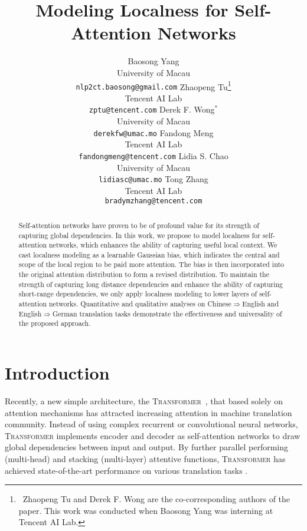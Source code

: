 \documentclass[11pt,a4paper]{article}
\title{Modeling Localness for Self-Attention Networks}
\author{Baosong Yang\\\normalsize University of Macau\\{\normalsize \tt nlp2ct.baosong@gmail.com} \And
Zhaopeng Tu\thanks{~Zhaopeng Tu and Derek F. Wong are the co-corresponding authors of the paper. This work was conducted when Baosong Yang was interning at Tencent AI Lab.}\\\normalsize Tencent AI Lab\\{\normalsize \tt zptu@tencent.com} \And
Derek F. Wong$^*$\\\normalsize University of Macau\\{\normalsize \tt derekfw@umac.mo} \AND
Fandong Meng\\\normalsize Tencent AI Lab\\{\normalsize \tt fandongmeng@tencent.com} \And
Lidia S. Chao\\\normalsize University of Macau\\{\normalsize \tt lidiasc@umac.mo} \And
Tong Zhang\\\normalsize Tencent AI Lab\\{\normalsize \tt bradymzhang@tencent.com}
}
\begin{document}
\maketitle
\begin{abstract}
Self-attention networks have proven to be of profound value for its strength of capturing global dependencies.
In this work, we propose to model localness for self-attention networks, which enhances the ability of capturing useful local context. We cast localness modeling as a learnable Gaussian bias, which indicates the central and scope of the local region to be paid more attention.
The bias is then incorporated into the original attention distribution to form a revised distribution.
To maintain the strength of capturing long distance dependencies and enhance the ability of capturing short-range dependencies, we only apply localness modeling to lower layers of self-attention networks.
Quantitative and qualitative analyses on Chinese$\Rightarrow$English and English$\Rightarrow$German translation tasks demonstrate the effectiveness and universality of the proposed approach.
\end{abstract}

\section{Introduction}

Recently, a new simple architecture, the \textsc{Transformer}~\cite{Vaswani:2017:NIPS}, that based solely on attention mechanisms has attracted increasing attention in machine translation community. 
Instead of using complex recurrent or convolutional neural networks, \textsc{Transformer} implements encoder and decoder as self-attention networks to draw global dependencies between input and output. 
By further parallel performing (multi-head) and stacking (multi-layer) attentive functions, 
\textsc{Transformer} has achieved state-of-the-art performance on various translation tasks \cite{shaw2018self,hassan2018achieving}.

\iffalse




Inspired by attention mechanism \cite{xu2015show,bahdanau2015neural,chorowski2015attention} which is exploited in conjunctions with recurrent neural networks (RNNs) or convolution neural networks (CNNs) and shown to succeed on learning the alignments or building connections between representations \cite{cho2014properties,tu2016modeling}, \newcite{Vaswani:2017:NIPS} introduced the self-attention mechanism which has recently gained popularity in modeling the strength of the relevance between the representation pairs of a neural network. By further parallel performing (multi-head) and stacking (multi-layer) attentive functions, \textsc{Transformer} \cite{Vaswani:2017:NIPS} has achieved state-of-the-art performance on various translation tasks \cite{shaw2018self,hassan2018achieving}.
\fi
\end{document}
